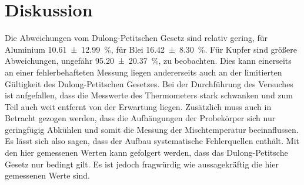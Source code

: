 \section{Diskussion}
\label{sec:Diskussion}
Die Abweichungen vom Dulong-Petitschen Gesetz sind relativ gering, für Aluminium \SI{10.61\pm12.99}{\percent}, für Blei \SI{16.42\pm8.30}{\percent}.
Für Kupfer sind größere Abweichungen, ungefähr \SI{95.20\pm20.37}{\percent}, zu beobachten.
Dies kann einerseits an einer fehlerbehafteten Messung liegen andererseits auch an der limitierten Gültigkeit des Dulong-Petitschen Gesetzes.
Bei der Durchführung des Versuches ist aufgefallen,
dass die Messwerte des Thermometers stark schwanken und zum Teil auch weit entfernt von der Erwartung liegen.
Zusätzlich muss auch in Betracht gezogen werden, dass die Aufhängungen der Probekörper sich nur geringfügig Abkühlen
und somit die Messung der Mischtemperatur beeinnflussen.
Es lässt sich also sagen, dass der Aufbau systematische Fehlerquellen enthält.
Mit den hier gemessenen Werten kann gefolgert werden, dass das Dulong-Petitsche Gesetz nur bedingt gilt.
Es ist jedoch fragwürdig wie aussagekräftig die hier gemessenen Werte sind.
